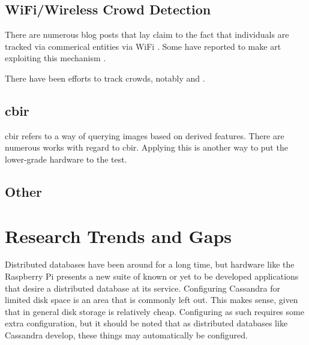 \subsection{WiFi/Wireless Crowd Detection}
There are numerous blog posts that lay claim to the fact that individuals are tracked via commerical entities via WiFi \cite{HaighTrackingConnected}. Some have reported to make art exploiting this mechanism \cite{KeebleCasual2013}.

There have been efforts to track crowds, notably \cite{Bonne2013WiFiPi:Events} and \cite{Schauer2014EstimatingBluetooth}.  

\subsection{\gls{cbir}}

\gls{cbir} refers to a way of querying images based on derived features.
There are numerous works with regard to \gls{cbir}.
Applying this is another way to put the lower-grade hardware to the test.

\subsection{Other}


\section{Research Trends and Gaps}

Distributed databases have been around for a long time, but hardware like the Raspberry Pi presents a new suite of known or yet to be developed applications that desire a distributed database at its service.
Configuring Cassandra for limited disk space is an area that is commonly left out.  This makes sense, given that in general disk storage is relatively cheap.  Configuring as such requires some extra configuration, but it should be noted that as distributed databases like Cassandra develop, these things may automatically be configured.